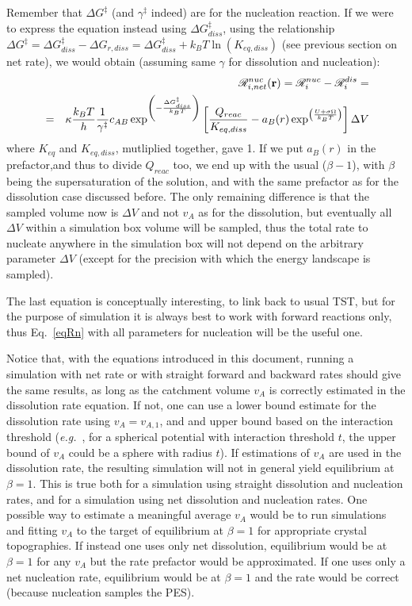 \documentclass[12pt]{paper}    %
\newcommand{\RR}{\mathscr{R}}
\newcommand{\eg}{\textit{e.g.}~}
\newcommand{\eqname}{Eq.~}
\begin{document}
Remember that $\Delta G^\ddag$ (and $\gamma^\ddag$ indeed) are for the nucleation reaction. If we were to express the equation instead using $\Delta G^\ddag_{diss}$, using the relationship $\Delta G^\ddag = \Delta G^\ddag_{diss} - \Delta G_{r,diss} = \Delta G^\ddag_{diss} +k_BT \ln(K_{eq,diss})$ (see previous section on net rate), we would obtain (assuming same $\gamma$ for dissolution and nucleation):
%
\begin{eqnarray}
&& \RR^{nuc}_{i,net}({\bf r}) = \RR^{nuc}_{i} - \RR^{dis}_{i} = \nonumber \\
&=&\kappa \frac{k_BT}{h} \frac{1}{\gamma^\ddag} c_{AB}\exp^{\left( - \frac{\Delta G^\ddag_{diss}}{k_BT}\right)} \left[ \frac{Q_{reac}}{K_{eq,diss}} - a_B(r) \exp^{\left( \frac{U + \sigma \Omega}{k_BT}\right)}  \right] \Delta V
\end{eqnarray}
%
where $K_{eq}$ and $K_{eq,diss}$, mutliplied together, gave 1. If we put $a_B(r)$ in the prefactor,and thus to divide $Q_{reac}$ too, we end up with the usual ($\beta -1$), with $\beta$ being the supersaturation of the solution, and with the same prefactor as for the dissolution case discussed before. The only remaining difference is that the sampled volume now is $\Delta V$ and not $v_A$ as for the dissolution, but eventually all $\Delta V$ within a simulation box volume will be sampled, thus the total rate to nucleate anywhere in the simulation box will not depend on the arbitrary parameter $\Delta V$ (except for the precision with which the energy landscape is sampled).

The last equation is conceptually interesting, to link back to usual TST, but for the purpose of simulation it is always best to work with forward reactions only, thus \eqname\ref{eqRn} with all parameters for nucleation will be the useful one.

Notice that, with the equations introduced in this document, running a simulation with net rate or with straight forward and backward rates should give the same results, as long as the catchment volume $v_A$ is correctly estimated in the dissolution rate equation. If not, one can use a lower bound estimate for the dissolution rate using $v_A=v_{A,1}$, and and upper bound based on the interaction threshold (\eg, for a spherical potential with interaction threshold $t$, the upper bound of $v_A$ could be a sphere with radius $t$). If estimations of $v_A$ are used in the dissolution rate, the resulting simulation will not in general yield equilibrium at $\beta=1$. This is true both for a simulation using straight dissolution and nucleation rates, and for a simulation using net dissolution and nucleation rates. One possible way to estimate a meaningful average $v_A$ would be to run simulations and fitting $v_A$ to the target of equilibrium at $\beta = 1$ for appropriate crystal topographies. If instead one uses only net dissolution, equilibrium would be at $\beta =1$ for any $v_A$ but the rate prefactor would be approximated. If one uses only a net nucleation rate, equilibrium would be at $\beta =1$ and the rate would be correct (because nucleation samples the PES). 
\end{document}

